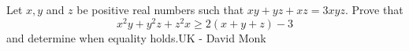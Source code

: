Let $x,y$ and $z$ be positive real numbers such that $xy+yz+xz=3xyz$. Prove that \[ x^2y+y^2z+z^2x \ge 2(x+y+z)-3 \] and determine when equality holds.UK - David Monk